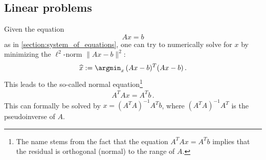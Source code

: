 \subsection{Linear problems}

    \begin{method}\label{data:normal_equation}
        Given the equation \[Ax=b\] as in \cref{section:system_of_equations}, one can try to numerically solve for $x$ by minimizing the $\ell^2$-norm $\|Ax-b\|^2$:
        \begin{gather}
            \widehat{x}:=\argmin_x\,(Ax-b)^T(Ax-b)\,.
        \end{gather}
        This leads to the so-called normal equation\footnote{The name stems from the fact that the equation $A^TAx = A^Tb$ implies that the residual is orthogonal (normal) to the range of $A$.}
        \begin{gather}
            A^TAx = A^Tb\,.
        \end{gather}
        This can formally be solved by $x=(A^TA)^{-1}A^Tb$, where $(A^TA)^{-1}A^T$ is the pseudoinverse of $A$.
    \end{method}

